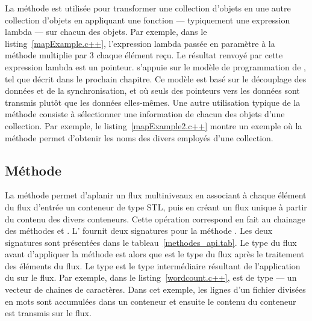 La m\'ethode  est utilis\'ee pour transformer une collection d'objets en une autre collection d'objets en appliquant une fonction --- typiquement une expression lambda --- sur chacun des objets. Par exemple, dans le listing~\ref{mapExample.c++}, l'expression lambda pass\'ee en param\`etre \`a la m\'ethode  multiplie par 3 chaque \'el\'ement re\c{c}u. Le r\'esultat renvoy\'e par cette expression lambda est un pointeur. \PpFf{} s'appuie sur le mod\`ele de programmation de , tel que d\'ecrit dans le prochain chapitre. Ce mod\`ele est bas\'e sur le d\'ecouplage des donn\'ees et de la synchronisation, et o\`u seuls des pointeurs vers les donn\'ees sont transmis plut\^ot que les donn\'ees elles-m\^emes.
%
%
Une autre utilisation typique de la méthode  consiste \`a s\'electionner une information de chacun des objets d'une collection. Par exemple, le listing~\ref{mapExample2.c++} montre un exemple o\`u la méthode  permet d'obtenir les noms des divers employ\'es d'une collection. 


\subsection{M\'ethode }

La m\'ethode   permet d'aplanir un flux multiniveaux en associant \`a chaque \'el\'ement du flux d'entr\'ee un conteneur de type STL, puis en cr\'eant un flux unique \`a partir du contenu des divers conteneurs. Cette op\'eration correspond en fait au chainage des m\'ethodes  et . L' fournit deux signatures pour la m\'ethode . Les deux signatures sont pr\'esent\'ees dans le tableau~\ref{methodes_api.tab}. Le type du flux avant d'appliquer la m\'ethode  est  alors que  est le type du flux apr\`es le traitement des \'el\'ements du flux. Le type  est le type interm\'ediaire r\'esultant de l'application du  sur le flux. Par exemple, dans le listing~\ref{wordcount.c++},  est de type  --- un vecteur de chaines de caract\`eres. Dans cet exemple, les lignes d'un fichier divis\'ees en mots sont accumul\'ees dans un conteneur et ensuite le contenu du conteneur est transmis sur le flux.


